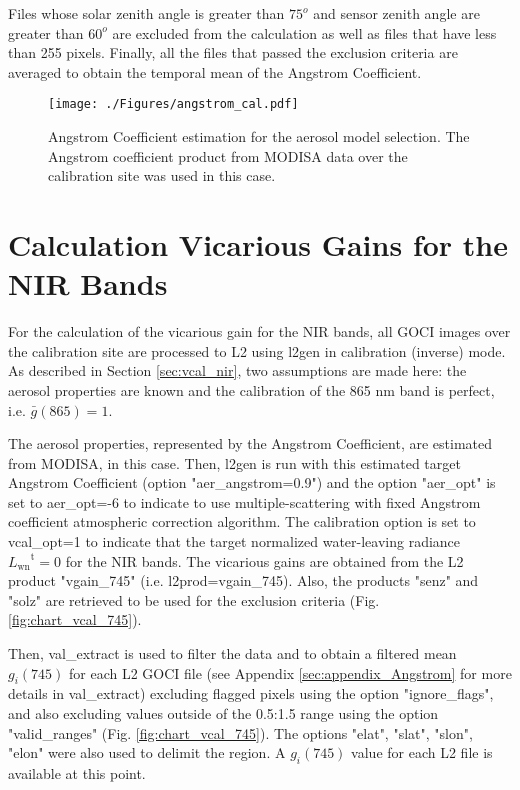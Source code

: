 \documentclass[]{interact}
\theoremstyle{plain}%
\theoremstyle{definition}
\theoremstyle{remark}
\begin{document}
Files whose solar zenith angle is greater than $75^o$ and sensor zenith angle are greater than $60^o$ are excluded from the calculation as well as files that have less than 255 pixels. Finally, all the files that passed the exclusion criteria are averaged to obtain the temporal mean of the Angstrom Coefficient. 
\begin{figure}[H]
  \centering
  \texttt{[image: ./Figures/angstrom\_cal.pdf]}
    \caption{Angstrom Coefficient estimation for the aerosol model selection. The Angstrom coefficient product from MODISA data over the calibration site was used in this case.  \label{fig:angstrom_cal}} 
\end{figure}
\section{Calculation Vicarious Gains for the NIR Bands}\label{sec:appendix_NIR}
For the calculation of the vicarious gain for the NIR bands, all GOCI images over the calibration site are processed to L2 using l2gen in calibration (inverse) mode. As described in Section \ref{sec:vcal_nir}, two assumptions are made here: the aerosol properties are known and the calibration of the 865 nm band is perfect, i.e. $\bar{g}(865)=1$. 

The aerosol properties, represented by the Angstrom Coefficient, are estimated from MODISA, in this case. Then, l2gen is run with this estimated target Angstrom Coefficient (option "aer\_angstrom=0.9") and the option "aer\_opt" is set to aer\_opt=-6 to indicate to use multiple-scattering with fixed Angstrom coefficient atmospheric correction algorithm. The calibration option is set to vcal\_opt=1 to indicate that the target normalized water-leaving radiance ${L_\text{wn}}^\text{t} = 0$ for the NIR bands. The vicarious gains are obtained from the L2 product "vgain\_745" (i.e. l2prod=vgain\_745). Also, the products "senz" and "solz" are retrieved to be used for the exclusion criteria (Fig. \ref{fig:chart_vcal_745}). 

Then, val\_extract is used to filter the data and to obtain a filtered mean $g_i(745)$ for each L2 GOCI file (see Appendix \ref{sec:appendix_Angstrom} for more details in val\_extract) excluding flagged pixels using the option "ignore\_flags", and also excluding values outside of the 0.5:1.5 range using the option "valid\_ranges" (Fig. \ref{fig:chart_vcal_745}).  The options "elat", "slat", "slon", "elon" were also used to delimit the region. A $g_i(745)$ value for each L2 file is available at this point.
\end{document}
